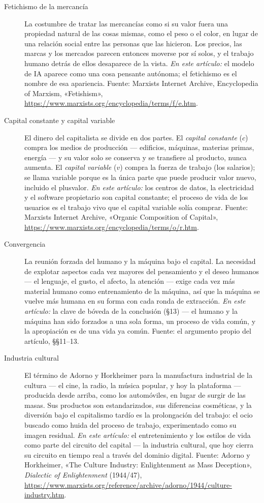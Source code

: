 \documentclass[11pt]{article}
\begin{document}
\begin{description}
\item[Fetichismo de la mercancía] La costumbre de tratar las mercancías
como si su valor fuera una propiedad natural de las cosas mismas, como
el peso o el color, en lugar de una relación social entre las personas
que las hicieron. Los precios, las marcas y los mercados parecen
entonces moverse por sí solos, y el trabajo humano detrás de ellos
desaparece de la vista. \emph{En este artículo:} el modelo de IA
aparece como una cosa pensante autónoma; el fetichismo es el nombre de
esa apariencia. Fuente: Marxists Internet Archive, Encyclopedia of
Marxism, «Fetishism»,
\url{https://www.marxists.org/encyclopedia/terms/f/e.htm}.

\item[Capital constante y capital variable] El dinero del capitalista se
divide en dos partes. El \emph{capital constante} ($c$) compra los
medios de producción --- edificios, máquinas, materias primas, energía
--- y su valor solo se conserva y se transfiere al producto, nunca
aumenta. El \emph{capital variable} ($v$) compra la fuerza de trabajo
(los salarios); se llama variable porque es la única parte que puede
producir valor nuevo, incluido el plusvalor. \emph{En este artículo:}
los centros de datos, la electricidad y el software propietario son
capital constante; el proceso de vida de los usuarios es el trabajo
vivo que el capital variable solía comprar. Fuente: Marxists Internet
Archive, «Organic Composition of Capital»,
\url{https://www.marxists.org/encyclopedia/terms/o/r.htm}.

\item[Convergencia] La reunión forzada del humano y la máquina bajo el
capital. La necesidad de explotar aspectos cada vez mayores del
pensamiento y el deseo humanos --- el lenguaje, el gusto, el afecto, la
atención --- exige cada vez más material humano como entrenamiento de la
máquina, así que la máquina se vuelve más humana en su forma con cada
ronda de extracción. \emph{En este artículo:} la clave de bóveda de la
conclusión (§13) --- el humano y la máquina han sido forzados a una sola
forma, un proceso de vida común, y la apropiación es de una vida ya
común. Fuente: el argumento propio del artículo, §§11--13.

\item[Industria cultural] El término de Adorno y Horkheimer para la
manufactura industrial de la cultura --- el cine, la radio, la música
popular, y hoy la plataforma --- producida desde arriba, como los
automóviles, en lugar de surgir de las masas. Sus productos son
estandarizados, sus diferencias cosméticas, y la diversión bajo el
capitalismo tardío es la prolongación del trabajo: el ocio buscado como
huida del proceso de trabajo, experimentado como su imagen residual.
\emph{En este artículo:} el entretenimiento y los estilos de vida como
parte del circuito del capital --- la industria cultural, que hoy cierra
su circuito en tiempo real a través del dominio digital. Fuente: Adorno
y Horkheimer, «The Culture Industry: Enlightenment as Mass Deception»,
\textit{Dialectic of Enlightenment} (1944/47),
\url{https://www.marxists.org/reference/archive/adorno/1944/culture-industry.htm}.


\end{description}
\end{document}
